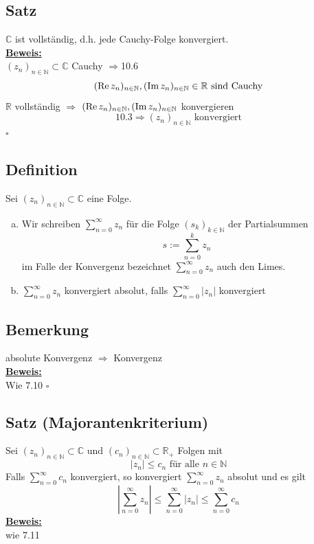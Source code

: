 
\subsection{Satz} %
\label{sub:satz}
$\mathds{C}$ ist vollständig, d.h. jede Cauchy-Folge konvergiert.
\vspace{\baselineskip} \\
\underline{\textbf{Beweis:}} \\
$(z_n)_{n \in \mathds{N}} \subset \mathds{C}$ Cauchy $\Rightarrow $10.6 
\[
	(\operatorname{Re} z_n)_{n \in \mathbb{N}} , (\operatorname{Im} z_n)_{n \in \mathbb{N}} \in \mathbb{R} \text{ sind Cauchy}
\]
$\mathds{R}$ vollständig $\Rightarrow $ $(\operatorname{Re} z_n)_{n \in \mathbb{N}}, (\operatorname{Im} z_n)_{n \in \mathbb{N}}$ konvergieren
\[
	10.3 \Rightarrow (z_n)_{n \in \mathds{N}} \text{ konvergiert}
\]
\hfill \( \square \)

\subsection{Definition} %
\label{sub:definition}
Sei $(z_n)_{n \in \mathds{N}} \subset \mathds{C}$ eine Folge.
\begin{enumerate}[a)]
	\item Wir schreiben $\sum\limits_{n=0}^{\infty} z_n$ für die Folge $(s_k)_{k \in \mathds{N}}$ der Partialsummen 
	\[
		s:= \sum\limits_{n=0}^{k} z_n 
	\]
	im Falle der Konvergenz bezeichnet $\sum\limits_{n=0}^{\infty} z_n $ auch den Limes.
	\item $\sum\limits_{n=0}^{\infty} z_n$ konvergiert absolut, falls $\sum\limits_{n=0}^{\infty} |z_n|$ konvergiert
\end{enumerate}

\subsection{Bemerkung} %
\label{sub:bemerkung}
absolute Konvergenz $\Rightarrow $ Konvergenz \\
\underline{\textbf{Beweis:}} \\
Wie 7.10 \hfill \( \square \)

\subsection{Satz (Majorantenkriterium)} %
\label{sub:satz}
Sei $(z_n)_{n \in \mathds{N}} \subset \mathds{C}$ und $(c_n)_{n \in \mathds{N}} \subset \mathds{R}_+$ Folgen mit 
\[
	|z_n| \le c_n \text{ für alle } n \in \mathds{N} 
\]
Falls $\sum\limits_{n=0}^{\infty} c_n$ konvergiert, so konvergiert $\sum\limits_{n=0}^{\infty} z_n$ absolut und es gilt 
\[
	 \left|\sum\limits_{n=0}^{\infty} z_n \right| \le \sum\limits_{n=0}^{\infty} |z_n| \le \sum\limits_{n=0}^{\infty} c_n
\] 
\underline{\textbf{Beweis:}} \\
wie 7.11

